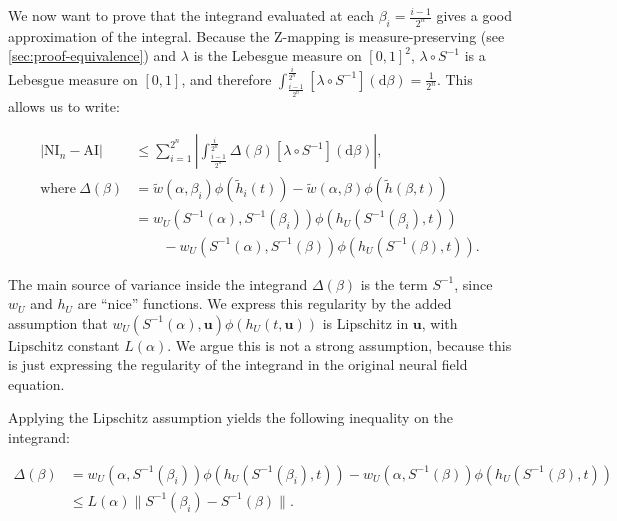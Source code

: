\documentclass[10pt,letterpaper]{article}
\def\d{\mathrm d}
\newcommand{\norm}[1]{\lVert{#1}\rVert}
\renewcommand{\vec}[1]{\boldsymbol{#1}}
\begin{document}
We now want to prove that the integrand evaluated at each $\beta_i = \tfrac{i-1}{2^n}$ gives a good approximation of the integral. Because the Z-mapping is measure-preserving (see \autoref{sec:proof-equivalence}) and $\lambda$ is the Lebesgue measure on $[0,1]^2$, $\lambda \circ S^{-1}$ is a Lebesgue measure on $[0,1]$, and therefore $\int_{\tfrac{i-1}{2^n}}^{\tfrac{i}{2^n}} \left[\lambda \circ S^{-1}\right](\d \beta) = \tfrac{1}{2^n}$. This allows us to write:

$$
\begin{aligned}
|\mathrm{NI}_n - \mathrm{AI}| &\leq \sum_{i=1}^{2^n} \left| \int_{\tfrac{i-1}{2^n}}^{\tfrac{i}{2^n}} \Delta(\beta) \left[\lambda \circ S^{-1}\right](\d \beta) \right|, \\
\text{where}\ \Delta(\beta) &= \tilde w(\alpha, \beta_i) \phi(\tilde h_i(t)) - \tilde w(\alpha, \beta) \phi(\tilde h(\beta, t))\\
&= w_U(S^{-1}(\alpha), S^{-1}(\beta_i)) \phi(h_U(S^{-1}(\beta_i), t)) \\ &\qquad- w_U(S^{-1}(\alpha), S^{-1}(\beta)) \phi(h_U(S^{-1}(\beta), t)).
\end{aligned}
$$

The main source of variance inside the integrand $\Delta(\beta)$ is the term $S^{-1}$, since $w_U$ and $h_U$ are ``nice'' functions. We express this regularity by the added assumption that $w_U(S^{-1}(\alpha), \vec u) \phi(h_U(t, \vec u))$ is Lipschitz in $\vec u$, with Lipschitz constant $L(\alpha)$. We argue this is not a strong assumption, because this is just expressing the regularity of the integrand in the original neural field equation.




Applying the Lipschitz assumption yields the following inequality on the integrand:

$$
\begin{aligned}
\Delta(\beta) &= w_U(\alpha, S^{-1}(\beta_i)) \phi(h_U(S^{-1}(\beta_i), t)) - w_U(\alpha, S^{-1}(\beta)) \phi(h_U(S^{-1}(\beta), t)) \\
&\leq L(\alpha) \norm{S^{-1}(\beta_i) - S^{-1}(\beta)}.
\end{aligned}
$$
\end{document}
